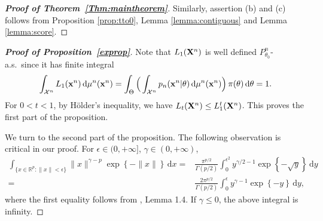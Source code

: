\documentclass[11pt]{article}
\theoremstyle{plain}
\theoremstyle{definition}
\theoremstyle{remark}
\begin{document}
\begin{appendices}
\begin{proof}[\textbf{Proof of Theorem~\ref{Thm:maintheorem}}]
        Similarly, assertion (b) and (c) follows from Proposition \ref{prop:tto0}, Lemma \ref{lemma:contiguous} and Lemma \ref{lemma:score}.

    \end{proof}







\begin{proof}[\textbf{Proof of Proposition~\ref{exprop}}]

Note that $L_1(\mathbf{X}^{n})$ is well defined $P_{\theta_0}^n$-a.s.\ since it has finite integral
$$
\int_{\mathcal{X}^n} L_1(\mathbf{x}^{n}) \, \mathrm d \mu^n (\mathbf{x}^n)=
\int_{\Theta}\Big(\int_{\mathcal{X}^n} p_n(\mathbf{x}^{n}|\theta) \, \mathrm d \mu^n (\mathbf{x}^n) \Big) \, \pi(\theta)\, \mathrm d \theta=1.
$$
For $0<t<1$, by H\"older's inequality, we have $L_{t}(\mathbf{X}^{n})\leq L_1^{t}(\mathbf{X}^{n})$. This proves the first part of the proposition. 

We turn to the second part of the proposition.
The following observation is critical in our proof.
For $\epsilon \in (0, +\infty]$, $\gamma \in (0, +\infty)$,
\begin{equation}\label{eq:fang}
\begin{aligned}
    \int_{\{x\in\mathbb R^p : \|x\| < \epsilon \}}
\| x \|^{\gamma - p} \exp \left\{ - \| x \| \right\}
\,\mathrm d x
=
&
\frac{\pi^{p/2}}{\Gamma (p/2)} \int_{0}^{\epsilon^2}  y^{ \gamma/2 - 1 } \exp \left\{  - \sqrt{y} \right\} \, \mathrm d y
\\
=
&
\frac{ 2 \pi^{p/2}}{\Gamma (p/2)} \int_{0}^{\epsilon}  y^{ \gamma - 1 } \exp \left\{  - {y} \right\} \, \mathrm d y
,
\end{aligned}
\end{equation}
where the first equality follows from \cite{Fang1990}, Lemma 1.4.
If $\gamma \leq 0$, the above integral is infinity.


\end{proof}
\end{appendices}
\end{document}
